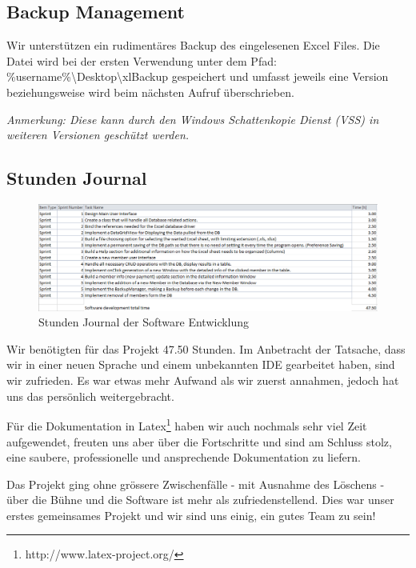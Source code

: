 \documentclass{article}
\begin{document}
\subsection{Backup Management}
Wir unterstützen ein rudimentäres Backup des eingelesenen Excel Files. Die Datei wird bei der ersten Verwendung unter dem Pfad: \%username\%\textbackslash Desktop\textbackslash xlBackup gespeichert und umfasst jeweils eine Version beziehungsweise wird beim nächsten Aufruf überschrieben.

\textit{Anmerkung: Diese kann durch den Windows Schattenkopie Dienst (VSS) in weiteren Versionen geschützt werden.}

\subsection{Stunden Journal}
\begin{figure}[h]
	\centering
	\includegraphics[width=1 \textwidth]{StundenJournal}
	\caption{Stunden Journal der Software Entwicklung}
\end{figure}

Wir benötigten für das Projekt 47.50 Stunden. Im Anbetracht der Tatsache, dass wir in einer neuen Sprache und einem unbekannten IDE gearbeitet haben, sind wir zufrieden. Es war etwas mehr Aufwand als wir zuerst annahmen, jedoch hat uns das persönlich weitergebracht.

Für die Dokumentation in Latex\footnote{http://www.latex-project.org/} haben wir auch nochmals sehr viel Zeit aufgewendet, freuten uns aber über die Fortschritte und sind am Schluss stolz, eine saubere, professionelle und ansprechende Dokumentation zu liefern.

Das Projekt ging ohne grössere Zwischenfälle - mit Ausnahme des Löschens - über die Bühne und die Software ist mehr als zufriedenstellend. Dies war unser erstes gemeinsames Projekt und wir sind uns einig, ein gutes Team zu sein!
\newpage
\end{document}
